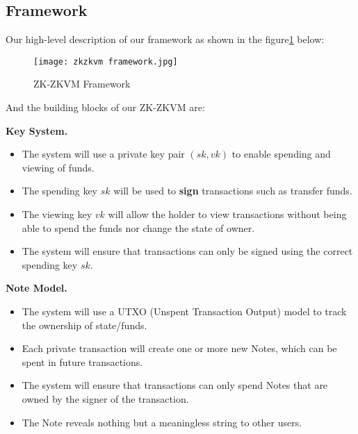 \subsection{Framework}\label{section: zk-zkvm-framework}

Our high-level description of our framework as shown in the figure\ref{fig:zk-zkvm-framework} below:
\begin{figure}[!ht]
    \centering
    \texttt{[image: zkzkvm framework.jpg]}
    \caption{ZK-ZKVM Framework}
    \label{fig:zk-zkvm-framework}
\end{figure}

And the building blocks of our ZK-ZKVM are:

\textbf{Key System.}
\begin{itemize}
    \item The system will use a private key pair $(sk, vk)$ to enable spending and viewing of funds.
    \item The spending key $sk$ will be used to \textbf{sign} transactions such as transfer funds.
    \item The viewing key $vk$ will allow the holder to view transactions without being able to spend the funds nor change the state of owner.
    \item The system will ensure that transactions can only be signed using the correct spending key $sk$.
\end{itemize}
\bigskip

\textbf{Note Model.}
\begin{itemize}
    \item The system will use a UTXO (Unspent Transaction Output) model to track the ownership of state/funds.
    \item Each private transaction will create one or more new Notes, which can be spent in future transactions.
    \item The system will ensure that transactions can only spend Notes that are owned by the signer of the transaction.
    \item The Note reveals nothing but a meaningless string to other users.
\end{itemize}
\bigskip

